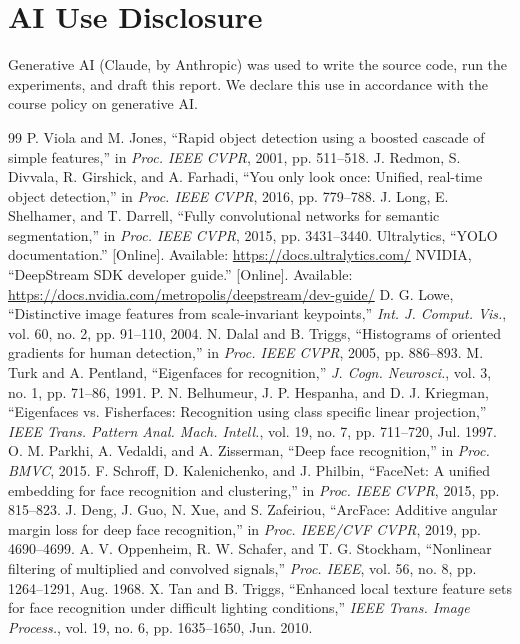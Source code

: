 \documentclass[conference,a4paper]{IEEEtran}
\begin{document}
\section*{AI Use Disclosure}
Generative AI (Claude, by Anthropic) was used to write the source code, run the experiments, and draft this report. We declare this use in accordance with the course policy on generative AI.

\begin{thebibliography}{99}
 P. Viola and M. Jones, ``Rapid object detection using a boosted cascade of simple features,'' in \emph{Proc. IEEE CVPR}, 2001, pp. 511--518.
 J. Redmon, S. Divvala, R. Girshick, and A. Farhadi, ``You only look once: Unified, real-time object detection,'' in \emph{Proc. IEEE CVPR}, 2016, pp. 779--788.
 J. Long, E. Shelhamer, and T. Darrell, ``Fully convolutional networks for semantic segmentation,'' in \emph{Proc. IEEE CVPR}, 2015, pp. 3431--3440.
 Ultralytics, ``YOLO documentation.'' [Online]. Available: \url{https://docs.ultralytics.com/}
 NVIDIA, ``DeepStream SDK developer guide.'' [Online]. Available: \url{https://docs.nvidia.com/metropolis/deepstream/dev-guide/}
 D. G. Lowe, ``Distinctive image features from scale-invariant keypoints,'' \emph{Int. J. Comput. Vis.}, vol. 60, no. 2, pp. 91--110, 2004.
 N. Dalal and B. Triggs, ``Histograms of oriented gradients for human detection,'' in \emph{Proc. IEEE CVPR}, 2005, pp. 886--893.
 M. Turk and A. Pentland, ``Eigenfaces for recognition,'' \emph{J. Cogn. Neurosci.}, vol. 3, no. 1, pp. 71--86, 1991.
 P. N. Belhumeur, J. P. Hespanha, and D. J. Kriegman, ``Eigenfaces vs. Fisherfaces: Recognition using class specific linear projection,'' \emph{IEEE Trans. Pattern Anal. Mach. Intell.}, vol. 19, no. 7, pp. 711--720, Jul. 1997.
 O. M. Parkhi, A. Vedaldi, and A. Zisserman, ``Deep face recognition,'' in \emph{Proc. BMVC}, 2015.
 F. Schroff, D. Kalenichenko, and J. Philbin, ``FaceNet: A unified embedding for face recognition and clustering,'' in \emph{Proc. IEEE CVPR}, 2015, pp. 815--823.
 J. Deng, J. Guo, N. Xue, and S. Zafeiriou, ``ArcFace: Additive angular margin loss for deep face recognition,'' in \emph{Proc. IEEE/CVF CVPR}, 2019, pp. 4690--4699.
 A. V. Oppenheim, R. W. Schafer, and T. G. Stockham, ``Nonlinear filtering of multiplied and convolved signals,'' \emph{Proc. IEEE}, vol. 56, no. 8, pp. 1264--1291, Aug. 1968.
 X. Tan and B. Triggs, ``Enhanced local texture feature sets for face recognition under difficult lighting conditions,'' \emph{IEEE Trans. Image Process.}, vol. 19, no. 6, pp. 1635--1650, Jun. 2010.

\end{thebibliography}
\end{document}
